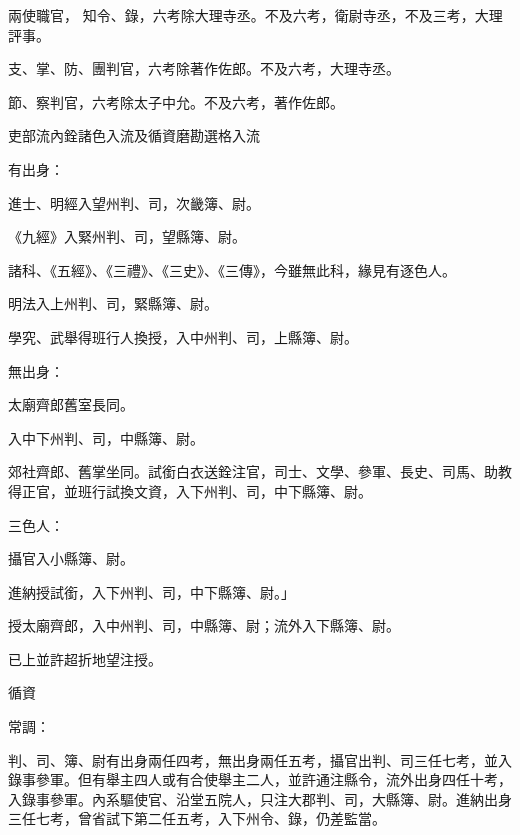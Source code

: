 \begin{pinyinscope}
 兩使職官，
 知令、錄，六考除大理寺丞。不及六考，衛尉寺丞，不及三考，大理評事。



 支、掌、防、團判官，六考除著作佐郎。不及六考，大理寺丞。



 節、察判官，六考除太子中允。不及六考，著作佐郎。



 吏部流內銓諸色入流及循資磨勘選格入流



 有出身：



 進士、明經入望州判、司，次畿簿、尉。



 《九經》入緊州判、司，望縣簿、尉。



 諸科、《五經》、《三禮》、《三史》、《三傳》，今雖無此科，緣見有逐色人。



 明法入上州判、司，緊縣簿、尉。



 學究、武舉得班行人換授，入中州判、司，上縣簿、尉。



 無出身：



 太廟齊郎舊室長同。



 入中下州判、司，中縣簿、尉。



 郊社齊郎、舊掌坐同。試銜白衣送銓注官，司士、文學、參軍、長史、司馬、助教得正官，並班行試換文資，入下州判、司，中下縣簿、尉。



 三色人：



 攝官入小縣簿、尉。



 進納授試銜，入下州判、司，中下縣簿、尉。」



 授太廟齊郎，入中州判、司，中縣簿、尉；流外入下縣簿、尉。



 已上並許超折地望注授。



 循資



 常調：



 判、司、簿、尉有出身兩任四考，無出身兩任五考，攝官出判、司三任七考，並入錄事參軍。但有舉主四人或有合使舉主二人，並許通注縣令，流外出身四任十考，入錄事參軍。內系驅使官、沿堂五院人，只注大郡判、司，大縣簿、尉。進納出身三任七考，曾省試下第二任五考，入下州令、錄，仍差監當。




\end{pinyinscope}
